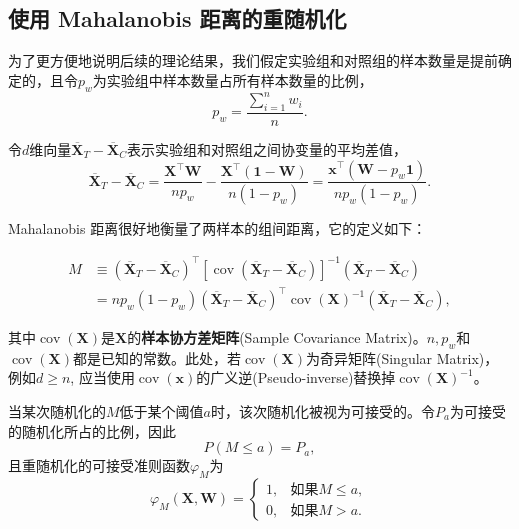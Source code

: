 \subsection{使用 Mahalanobis 距离的重随机化}\label{马氏距离}

为了更方便地说明后续的理论结果，我们假定实验组和对照组的样本数量是提前确定的，且令$p_w$为实验组中样本数量占所有样本数量的比例，
\begin{equation}
    p_w=\frac{\sum_{i=1}^n w_i}{n}.
\end{equation}

令$d$维向量$\overline{\mathbf{X}}_T-\overline{\mathbf{X}}_C$表示实验组和对照组之间协变量的平均差值，
\begin{equation}\label{x_T-x_C}
    \overline{\mathbf{X}}_T-\overline{\mathbf{X}}_C=\frac{\mathbf{X}^{\top} \mathbf{W}}{n p_w}-\frac{\mathbf{X}^{\top}(\mathbf{1}-\mathbf{W})}{n\left(1-p_w\right)}=\frac{\mathbf{x}^{\top}\left(\mathbf{W}-p_w \mathbf{1}\right)}{n p_w\left(1-p_w\right)} .
\end{equation}

Mahalanobis 距离很好地衡量了两样本的组间距离，它的定义如下：

\begin{equation}\label{M's def}
    \begin{aligned}
        M & \equiv\left(\overline{\mathbf{X}}_T-\overline{\mathbf{X}}_C\right)^{\top}\left[\operatorname{cov}\left(\overline{\mathbf{X}}_T-\overline{\mathbf{X}}_C\right)\right]^{-1}\left(\overline{\mathbf{X}}_T-\overline{\mathbf{X}}_C\right) \\
        & =n p_w\left(1-p_w\right)\left(\overline{\mathbf{X}}_T-\overline{\mathbf{X}}_C\right)^{\top} \operatorname{cov}(\mathbf{X})^{-1}\left(\overline{\mathbf{X}}_T-\overline{\mathbf{X}}_C\right),
    \end{aligned}
\end{equation}

其中$\operatorname{cov}(\mathbf{X})$是$\mathbf{X}$的\textbf{样本协方差矩阵}(Sample Covariance Matrix)。$n, p_w$和$\operatorname{cov}(\mathbf{X})$都是已知的常数。此处，若$\operatorname{cov}(\mathbf{X})$为奇异矩阵(Singular Matrix)，例如$d \geq n$, 应当使用$\operatorname{cov}(\mathbf{x})$的广义逆(Pseudo-inverse)替换掉$\operatorname{cov}(\mathbf{X})^{-1}$。

当某次随机化的$M$低于某个阈值$a$时，该次随机化被视为可接受的。令$P_a$为可接受的随机化所占的比例，因此
\begin{equation}
    P(M \leq a) = P_a,
\end{equation}
且重随机化的可接受准则函数$\varphi_{M}$为
\begin{equation}\label{重随机化准则}
    \varphi_{M}(\mathbf{X},\mathbf{W}) = \begin{cases}
        1,& \text{如果} M \leq a,\\
        0,& \text{如果} M > a.
    \end{cases}
\end{equation}

